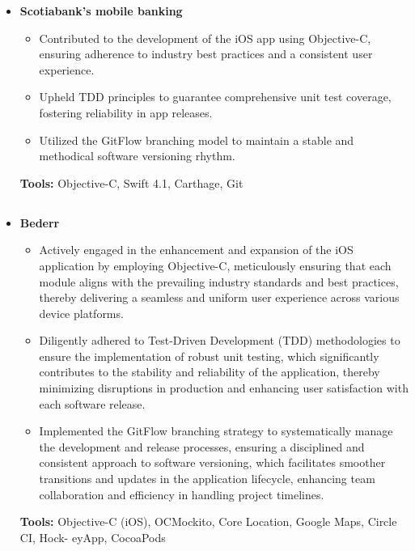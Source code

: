 \documentclass[11pt,a4paper,english]{moderncv}
\begin{document}
{\begin{itemize}
\begin{itemize}
        \end{itemize}
        \textbf{Tools:} Python, asyncio, Flask, SQLAlchemy, MySQL, MongoDB, Mock, Git, Docker
    \item \textbf{Scotiabank's mobile banking}
        \begin{itemize}
            \item Contributed to the development of the iOS app using Objective-C, ensuring adherence to industry best practices and a consistent user experience.
            \item Upheld TDD principles to guarantee comprehensive unit test coverage, fostering reliability in app releases.
            \item Utilized the GitFlow branching model to maintain a stable and methodical software versioning rhythm.
        \end{itemize}
        \textbf{Tools:} Objective-C, Swift 4.1, Carthage, Git
\end{itemize}
}

\subsection{}

{
\begin{itemize}
    \item \textbf{Bederr}
        \begin{itemize}
            \item Actively engaged in the enhancement and expansion of the iOS application by employing Objective-C, meticulously ensuring that each module aligns with the prevailing industry standards and best practices, thereby delivering a seamless and uniform user experience across various device platforms.
            \item Diligently adhered to Test-Driven Development (TDD) methodologies to ensure the implementation of robust unit testing, which significantly contributes to the stability and reliability of the application, thereby minimizing disruptions in production and enhancing user satisfaction with each software release.
            \item Implemented the GitFlow branching strategy to systematically manage the development and release processes, ensuring a disciplined and consistent approach to software versioning, which facilitates smoother transitions and updates in the application lifecycle, enhancing team collaboration and efficiency in handling project timelines.
        \end{itemize}
        \textbf{Tools:} Objective-C (iOS), OCMockito, Core Location, Google Maps, Circle CI, Hock- eyApp, CocoaPods
\end{itemize}
}
\end{document}
